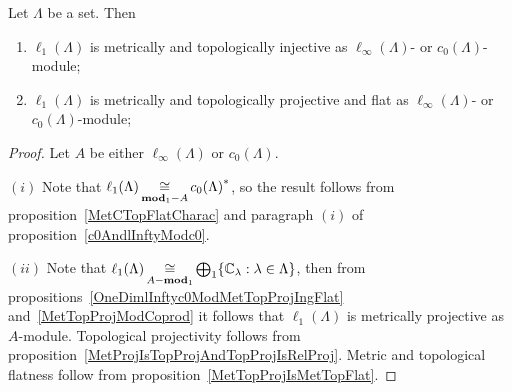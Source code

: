 \begin{proposition}\label{c0AndlInftyModl1} Let $\Lambda$ be a set. Then

\begin{enumerate}[label = (\roman*)]
    \item $\ell_1(\Lambda)$ is metrically and topologically injective as
    $\ell_\infty(\Lambda)$- or $c_0(\Lambda)$-module;

    \item $\ell_1(\Lambda)$ is metrically and topologically projective and 
    flat as $\ell_\infty(\Lambda)$- or $c_0(\Lambda)$-module;
\end{enumerate}
\end{proposition}
\begin{proof} Let $A$ be either $\ell_\infty(\Lambda)$ or $c_0(\Lambda)$.

$(i)$ Note that $\ell_1(\Lambda)\mathop{\mathbin{\cong}}\limits_{\mathbf{mod}_1-A}{c_0(\Lambda)}^*$, so the
result follows from proposition~\ref{MetCTopFlatCharac} and paragraph $(i)$ of
proposition~\ref{c0AndlInftyModc0}.

$(ii)$ Note that 
$\ell_1(\Lambda)
\mathop{\mathbin{\cong}}\limits_{A-\mathbf{mod}_1}
\bigoplus_1 \{\mathbb{C}_\lambda:\lambda\in\Lambda \}$, then from
propositions~\ref{OneDimlInftyc0ModMetTopProjIngFlat}
and~\ref{MetTopProjModCoprod} it follows that $\ell_1(\Lambda)$ is metrically
projective as $A$-module. Topological projectivity follows from
proposition~\ref{MetProjIsTopProjAndTopProjIsRelProj}. Metric and topological
flatness follow from proposition~\ref{MetTopProjIsMetTopFlat}.
\end{proof}

